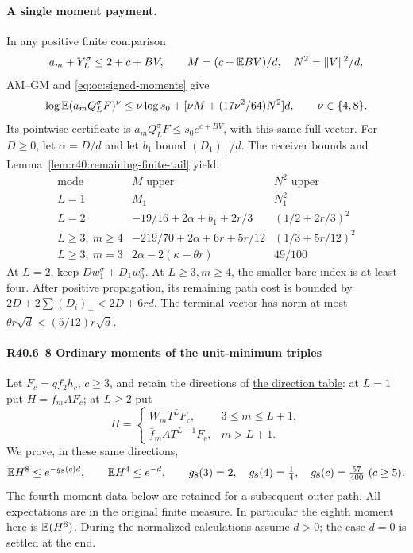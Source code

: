 \paragraph{A single moment payment.}
In any positive finite comparison
\[
 a_m+Y_L^\sigma\le2+c+BV,\qquad
 M=(c+\mathbb E BV)/d,\quad N^2=\|V\|^2/d,
\]
AM--GM and \eqref{eq:oc:signed-moments} give
\begin{equation}\label{eq:r40:remaining-payment}
 \log\mathbb E(a_mQ_L^\sigma F)^\nu
 \le\nu\log s_0+
   [\nu M+(17\nu^2/64)N^2]d,\qquad \nu\in\{4,8\}.
\end{equation}
Its pointwise certificate is
\(a_mQ_L^\sigma F\le s_0e^{c+BV}\), with this same full vector.
For \(D\ge0\), let \(\alpha=D/d\) and let \(b_1\) bound \((D_1)_+/d\).
The receiver bounds and Lemma~\ref{lem:r40:remaining-finite-tail} yield:
\begin{equation}\label{eq:r40:remaining-modes}
 \begin{array}{c|c|c}
 \text{mode}&M\text{ upper}&N^2\text{ upper}\\ \hline
 L=1&M_1&N_1^2\\
 L=2&-19/16+2\alpha+b_1+2r/3&(1/2+2r/3)^2\\
 L\ge3,\ m\ge4&-219/70+2\alpha+6r+5r/12&(1/3+5r/12)^2\\
 L\ge3,\ m=3&2\alpha-2(\kappa-\theta r)&49/100
 \end{array}
\end{equation}
At \(L=2\), keep \(D w_1^\sigma+D_1w_0^\sigma\).
At \(L\ge3,m\ge4\), the smaller bare index is at least four.
After positive propagation, its remaining path cost is bounded by
\(2D+2\sum(D_i)_+<2D+6rd\).
The terminal vector has norm at most \(\theta r\sqrt d<(5/12)r\sqrt d\).



\paragraph{R40.6--8 Ordinary moments of the unit-minimum triples}
\label{part:outer-unit:triples}
Let \(F_c=qf_2h_c\), \(c\ge3\), and retain the directions of
\hyperref[part:R40.1]{the direction table}: at \(L=1\) put
\(H=\bar f_mAF_c\); at \(L\ge2\) put
\[
 H=\begin{cases}W_mT^LF_c,&3\le m\le L+1,\\
                 \bar f_mAT^{L-1}F_c,&m>L+1.\end{cases}
\]
We prove, in these same directions,
\begin{equation}\label{eq:outer-unit:ordinary-rates}
 \mathbb E H^8\le e^{-g_8(c)d},\qquad \mathbb E H^4\le e^{-d},\qquad
 g_8(3)=2,\quad g_8(4)=\tfrac14,\quad
 g_8(c)=\tfrac{57}{400}\ (c\ge5).
\end{equation}
The fourth-moment data below are retained for a subsequent outer path.
All expectations are in the original finite measure. In particular the
eighth moment here is \(\mathbb E(H^8)\).
During the normalized calculations assume \(d>0\); the case \(d=0\)
is settled at the end.

